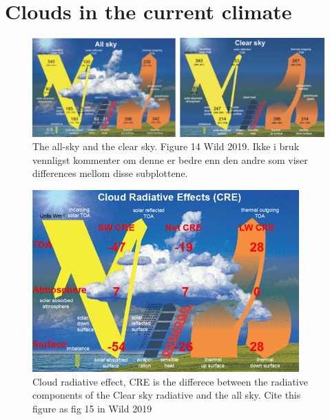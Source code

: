 \section{Clouds in the current climate}
\begin{figure}
    \centering
    \includegraphics[scale = 7]{Chapter1_Intro/images/both_wild2019.jpg}
    \caption{The all-sky and the clear sky. Figure 14 Wild 2019. Ikke i bruk vennligst kommenter om denne er bedre enn den andre som viser differences mellom disse subplottene.}
    \label{fig:both_wild}
\end{figure}

\begin{figure}
    \centering
    \includegraphics[scale = 7]{Chapter1_Intro/images/CRE_wild2019.jpg}
    \caption{Cloud radiative effect, CRE is the differece between the radiative components of the Clear sky radiative and the all sky. Cite this figure as fig 15 in Wild 2019}
    \label{fig:cre}
\end{figure}

